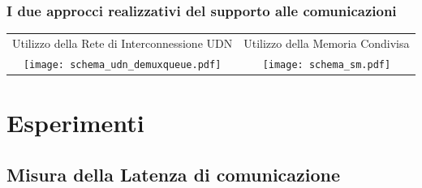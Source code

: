 \documentclass{beamer}
\begin{document}

\begin{frame}
  \frametitle{I due approcci realizzativi del supporto alle comunicazioni}
  \begin{center}
    \begin{tabular}{cc}
      \tiny Utilizzo della Rete di Interconnessione \scriptsize UDN &
      \tiny Utilizzo della Memoria Condivisa \\
      \texttt{[image: schema\_udn\_demuxqueue.pdf]} &
      \texttt{[image: schema\_sm.pdf]}
    \end{tabular}
  \end{center}
\end{frame}

\section{Esperimenti}

\subsection{Misura della Latenza di comunicazione}
\end{document}

